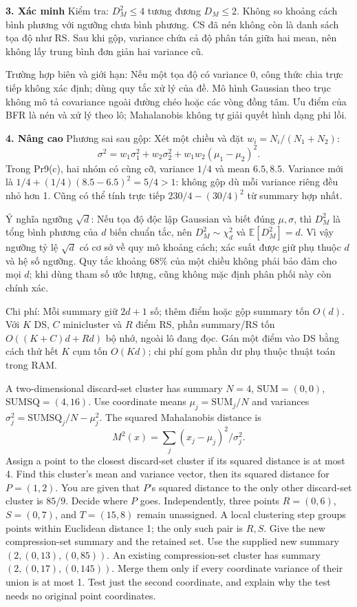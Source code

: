 \documentclass[10pt,a4paper,twocolumn]{article}
\newcommand{\key}[1]{#1:\enspace}
\newcommand{\unitheading}[2]{%
  \par\addvspace{1pt}\noindent\textbf{#1. #2}\enspace}
\newcommand{\unitverification}{\unitheading{3}{Xác minh}}
\newcommand{\unitadvanced}{\unitheading{4}{Nâng cao}}
\begin{document}
\unitverification
\key{Kiểm tra} $D_M^2\le4$ tương đương $D_M\le2$. Không so khoảng cách bình phương với ngưỡng chưa bình phương. CS đã nén không còn là danh sách tọa độ như RS. Sau khi gộp, variance chứa cả độ phân tán giữa hai mean, nên không lấy trung bình đơn giản hai variance cũ.

\key{Trường hợp biên và giới hạn} Nếu một tọa độ có variance 0, công thức chia trực tiếp không xác định; dùng quy tắc xử lý của đề. Mô hình Gaussian theo trục không mô tả covariance ngoài đường chéo hoặc các vòng đồng tâm. Ưu điểm của BFR là nén và xử lý theo lô; Mahalanobis không tự giải quyết hình dạng phi lồi.

\unitadvanced
\key{Phương sai sau gộp} Xét một chiều và đặt $w_i=N_i/(N_1+N_2)$:
\[
\sigma^2=w_1\sigma_1^2+w_2\sigma_2^2+w_1w_2(\mu_1-\mu_2)^2.
\]
Trong Pr9(c), hai nhóm có cùng cỡ, variance $1/4$ và mean $6.5,8.5$. Variance mới là $1/4+(1/4)(8.5-6.5)^2=5/4>1$: không gộp dù mỗi variance riêng đều nhỏ hơn 1. Cũng có thể tính trực tiếp $230/4-(30/4)^2$ từ summary hợp nhất.

\key{Ý nghĩa ngưỡng $\sqrt d$} Nếu tọa độ độc lập Gaussian và biết đúng $\mu,\sigma$, thì $D_M^2$ là tổng bình phương của $d$ biến chuẩn tắc, nên $D_M^2\sim\chi_d^2$ và $\mathbb E[D_M^2]=d$. Vì vậy ngưỡng tỷ lệ $\sqrt d$ có cơ sở về quy mô khoảng cách; xác suất được giữ phụ thuộc $d$ và hệ số ngưỡng. Quy tắc khoảng $68\%$ của một chiều không phải bảo đảm cho mọi $d$; khi dùng tham số ước lượng, cũng không mặc định phân phối này còn chính xác.

\key{Chi phí} Mỗi summary giữ $2d+1$ số; thêm điểm hoặc gộp summary tốn $O(d)$. Với $K$ DS, $C$ minicluster và $R$ điểm RS, phần summary/RS tốn $O((K+C)d+Rd)$ bộ nhớ, ngoài lô đang đọc. Gán một điểm vào DS bằng cách thử hết $K$ cụm tốn $O(Kd)$; chi phí gom phần dư phụ thuộc thuật toán trong RAM.


A two-dimensional discard-set cluster has summary $N=4$, $\mathrm{SUM}=(0,0)$, $\mathrm{SUMSQ}=(4,16)$. Use coordinate means $\mu_j=\mathrm{SUM}_j/N$ and variances $\sigma_j^2=\mathrm{SUMSQ}_j/N-\mu_j^2$. The squared Mahalanobis distance is
\[
M^2(x)=\sum_j(x_j-\mu_j)^2/\sigma_j^2.
\]
Assign a point to the closest discard-set cluster if its squared distance is at most 4.
 Find this cluster's mean and variance vector, then its squared distance for $P=(1,2)$. You are given that $P$'s squared distance to the only other discard-set cluster is $85/9$. Decide where $P$ goes.
 Independently, three points $R=(0,6)$, $S=(0,7)$, and $T=(15,8)$ remain unassigned. A local clustering step groups points within Euclidean distance 1; the only such pair is $R,S$. Give the new compression-set summary and the retained set.
 Use the supplied new summary $(2,(0,13),(0,85))$. An existing compression-set cluster has summary $(2,(0,17),(0,145))$. Merge them only if every coordinate variance of their union is at most 1. Test just the second coordinate, and explain why the test needs no original point coordinates.
\end{document}
